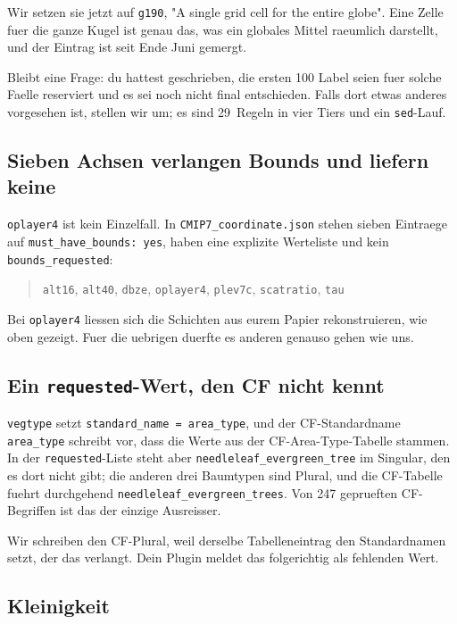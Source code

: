 \documentclass[11pt,a4paper]{article}
\newcommand{\code}[1]{\texttt{\small #1}}
\begin{document}
Wir setzen sie jetzt auf \code{g190}, "A single grid cell for the entire globe". Eine
Zelle fuer die ganze Kugel ist genau das, was ein globales Mittel raeumlich
darstellt, und der Eintrag ist seit Ende Juni gemergt.

Bleibt eine Frage: du hattest geschrieben, die ersten 100 Label seien fuer solche
Faelle reserviert und es sei noch nicht final entschieden. Falls dort etwas anderes
vorgesehen ist, stellen wir um; es sind 29~Regeln in vier Tiers und ein
\code{sed}-Lauf.

\subsection*{Sieben Achsen verlangen Bounds und liefern keine}

\code{oplayer4} ist kein Einzelfall. In \code{CMIP7\_coordinate.json} stehen sieben
Eintraege auf \code{must\_have\_bounds: yes}, haben eine explizite Werteliste und kein
\code{bounds\_requested}:

\begin{quote}
\code{alt16}, \code{alt40}, \code{dbze}, \code{oplayer4}, \code{plev7c},
\code{scatratio}, \code{tau}
\end{quote}

Bei \code{oplayer4} liessen sich die Schichten aus eurem Papier rekonstruieren, wie
oben gezeigt. Fuer die uebrigen duerfte es anderen genauso gehen wie uns.

\subsection*{Ein \code{requested}-Wert, den CF nicht kennt}

\code{vegtype} setzt \code{standard\_name = area\_type}, und der CF-Standardname
\code{area\_type} schreibt vor, dass die Werte aus der CF-Area-Type-Tabelle stammen.
In der \code{requested}-Liste steht aber \code{needleleaf\_evergreen\_tree} im
Singular, den es dort nicht gibt; die anderen drei Baumtypen sind Plural, und die
CF-Tabelle fuehrt durchgehend \code{needleleaf\_evergreen\_trees}. Von 247 geprueften
CF-Begriffen ist das der einzige Ausreisser.

Wir schreiben den CF-Plural, weil derselbe Tabelleneintrag den Standardnamen setzt,
der das verlangt. Dein Plugin meldet das folgerichtig als fehlenden Wert.

\subsection*{Kleinigkeit}
\end{document}
